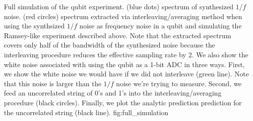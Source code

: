 \documentclass[twocolumn]{article}
\begin{document}
{Full simulation of the qubit experiment.
(blue dots) spectrum of synthesized $1/f$ noise.
(red circles) spectrum extracted via interleaving/averaging method when using the synthsized $1/f$ noise as frequency noise in a qubit and simulating the Ramsey-like experiment described above.
Note that the extracted spectrum covers only half of the bandwidth of the synthesized noise because the interleaving procedure reduces the effective sampling rate by 2.
We also show the white noise associated with using the qubit as a 1-bit ADC in three ways.
First, we show the white noise we would have if we did not interleave (green line).
Note that this noise is larger than the $1/f$ noise we're trying to measure.
Second, we feed an uncorrelated string of 0's and 1's into the interleaving/averaging procedure (black circles).
Finally, we plot the analytic prediction prediction for the uncorrelated string (black line).}
{fig:full_simulation}



\end{document}
